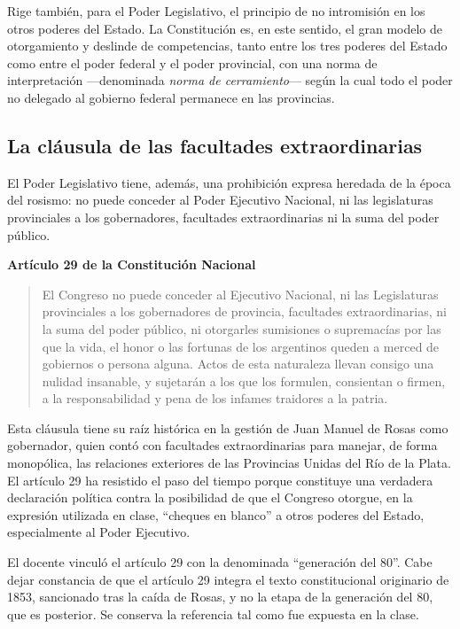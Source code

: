 \documentclass[12pt,oneside]{book}
\newenvironment{normacitada}[1]{%
    \medskip
    \noindent\textbf{#1}\par\smallskip
    \begin{quote}\itshape
}{%
    \end{quote}
    \medskip
}
\begin{document}
Rige también, para el Poder Legislativo, el principio de no intromisión en los otros poderes del Estado. La Constitución es, en este sentido, el gran modelo de otorgamiento y deslinde de competencias, tanto entre los tres poderes del Estado como entre el poder federal y el poder provincial, con una norma de interpretación —denominada \emph{norma de cerramiento}— según la cual todo el poder no delegado al gobierno federal permanece en las provincias.

\subsection{La cláusula de las facultades extraordinarias}

El Poder Legislativo tiene, además, una prohibición expresa heredada de la época del rosismo: no puede conceder al Poder Ejecutivo Nacional, ni las legislaturas provinciales a los gobernadores, facultades extraordinarias ni la suma del poder público.

\begin{normacitada}{Artículo 29 de la Constitución Nacional}
El Congreso no puede conceder al Ejecutivo Nacional, ni las Legislaturas provinciales a los gobernadores de provincia, facultades extraordinarias, ni la suma del poder público, ni otorgarles sumisiones o supremacías por las que la vida, el honor o las fortunas de los argentinos queden a merced de gobiernos o persona alguna. Actos de esta naturaleza llevan consigo una nulidad insanable, y sujetarán a los que los formulen, consientan o firmen, a la responsabilidad y pena de los infames traidores a la patria.
\end{normacitada}

Esta cláusula tiene su raíz histórica en la gestión de Juan Manuel de Rosas como gobernador, quien contó con facultades extraordinarias para manejar, de forma monopólica, las relaciones exteriores de las Provincias Unidas del Río de la Plata. El artículo 29 ha resistido el paso del tiempo porque constituye una verdadera declaración política contra la posibilidad de que el Congreso otorgue, en la expresión utilizada en clase, ``cheques en blanco'' a otros poderes del Estado, especialmente al Poder Ejecutivo.

\begin{note}
El docente vinculó el artículo 29 con la denominada ``generación del 80''. Cabe dejar constancia de que el artículo 29 integra el texto constitucional originario de 1853, sancionado tras la caída de Rosas, y no la etapa de la generación del 80, que es posterior. Se conserva la referencia tal como fue expuesta en la clase.
\end{note}
\end{document}
